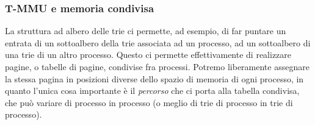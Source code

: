 \documentclass[a4paper,11pt]{article}
\begin{document}
\subsubsection{T-MMU e memoria condivisa}
La struttura ad albero delle trie ci permette, ad esempio, di far puntare un entrata di un sottoalbero della trie associata ad un processo, ad un sottoalbero di una trie di un altro processo.
Questo ci permette effettivamente di realizzare pagine, o tabelle di pagine, condivise fra processi.
Potremo liberamente assegnare la stessa pagina in posizioni diverse dello spazio di memoria di ogni processo, in quanto l'unica cosa importante è il \textit{percorso} che ci porta alla tabella condivisa, che può variare di processo in processo (o meglio di trie di processo in trie di processo).
\end{document}
